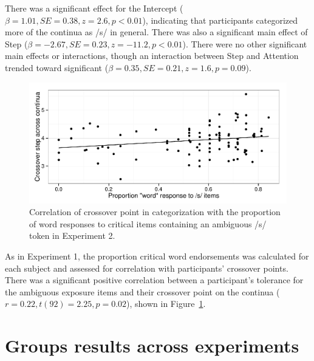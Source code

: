There was a significant effect for the Intercept ($\beta = 1.01, SE = 0.38, z = 2.6, p < 0.01$), indicating that participants categorized more of the continua as /s/ in general.  There was also a significant main effect of Step ($\beta = -2.67, SE = 0.23, z = -11.2, p < 0.01$).  There were no other significant main effects or interactions, though an interaction between Step and Attention trended toward significant ($\beta = 0.35, SE = 0.21, z = 1.6, p = 0.09$).

\begin{figure}[!ht]

\caption{Correlation of crossover point in categorization with the proportion of word responses to critical items containing an ambiguous /s/ token in Experiment 2.}\label{fig:exp2xover}
\begin{center}
\includegraphics[width=\textwidth]{graphs/exp2_xoverwordresp}
\end{center}
\end{figure}

As in Experiment 1,  the proportion critical word endorsements was calculated for each subject and assessed for correlation with participants' crossover points. There was a significant positive correlation between a participant's tolerance for the ambiguous exposure items and their crossover point on the continua ($r = 0.22, t (92) = 2.25, p = 0.02$), shown in Figure~\ref{fig:exp2xover}.  

\section{Groups results across experiments}

